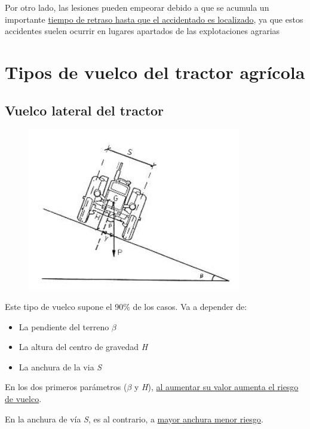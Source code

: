 \documentclass[a4paper,12pt,oneside]{book}
\begin{document}
Por otro lado, las lesiones pueden empeorar debido a que se acumula un
importante \uline{tiempo de retraso hasta que el accidentado es localizado}, ya que
estos accidentes suelen ocurrir en lugares apartados de las explotaciones
agrarias 

\section{Tipos de vuelco del tractor agrícola}
\label{sec:orgb6f9b0c}
\subsection{Vuelco lateral del tractor}
\label{sec:org8b810fb}

\begin{figure}[htbp]
\centering
\includegraphics[width=.9\linewidth]{./img_0009/vuelco_lat_graf.PNG}
\caption{}
\end{figure}

Este tipo de vuelco supone el 90\% de los casos. Va a depender de:
\begin{itemize}
\item La pendiente del terreno \(\beta\)
\item La altura del centro de gravedad \emph{H}
\item La anchura de la via \emph{S}
\end{itemize}

En los dos primeros parámetros (\(\beta\) y \emph{H}), \uline{al aumentar su valor aumenta el 
riesgo de vuelco}. 

En la anchura de vía \emph{S}, es al contrario, a \uline{mayor anchura menor riesgo}.
\end{document}
